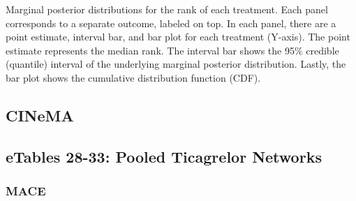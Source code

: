 \documentclass[
  12pt,
]{article}
\begin{document}
Marginal posterior distributions for the rank of each treatment. Each
panel corresponds to a separate outcome, labeled on top. In each panel,
there are a point estimate, interval bar, and bar plot for each
treatment (Y-axis). The point estimate represents the median rank. The
interval bar shows the 95\% credible (quantile) interval of the
underlying marginal posterior distribution. Lastly, the bar plot shows
the cumulative distribution function (CDF).

\newpage

\begin{landscape}

\hypertarget{cinema}{%
\section{CINeMA}\label{cinema}}

\hypertarget{etables-28-33-pooled-ticagrelor-networks}{%
\subsection{eTables 28-33: Pooled Ticagrelor
Networks}\label{etables-28-33-pooled-ticagrelor-networks}}

\hypertarget{mace-1}{%
\subsubsection{MACE}\label{mace-1}}


\end{landscape}
\end{document}
